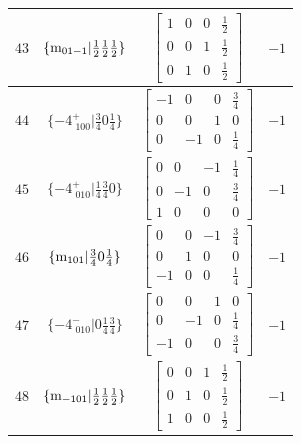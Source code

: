 \documentclass[fleqn,8pt]{jsarticle}
\begin{document}
\begin{longtable}{cccc}
$ 43 $ & $ \{{\rm m}_{01-1}|\frac{1}{2} \frac{1}{2} \frac{1}{2}\} $ & $ \begin{bmatrix} 1 & 0 & 0 & \frac{1}{2} \\ 0 & 0 & 1 & \frac{1}{2} \\ 0 & 1 & 0 & \frac{1}{2} \end{bmatrix} $ & $ -1 $ \\ \hline
$ 44 $ & $ \{-4^{+}_{\,\,100}|\frac{3}{4} 0 \frac{1}{4}\} $ & $ \begin{bmatrix} -1 & 0 & 0 & \frac{3}{4} \\ 0 & 0 & 1 & 0 \\ 0 & -1 & 0 & \frac{1}{4} \end{bmatrix} $ & $ -1 $ \\ \hline
$ 45 $ & $ \{-4^{+}_{\,\,010}|\frac{1}{4} \frac{3}{4} 0\} $ & $ \begin{bmatrix} 0 & 0 & -1 & \frac{1}{4} \\ 0 & -1 & 0 & \frac{3}{4} \\ 1 & 0 & 0 & 0 \end{bmatrix} $ & $ -1 $ \\ \hline
$ 46 $ & $ \{{\rm m}_{101}|\frac{3}{4} 0 \frac{1}{4}\} $ & $ \begin{bmatrix} 0 & 0 & -1 & \frac{3}{4} \\ 0 & 1 & 0 & 0 \\ -1 & 0 & 0 & \frac{1}{4} \end{bmatrix} $ & $ -1 $ \\ \hline
$ 47 $ & $ \{-4^{-}_{\,\,010}|0 \frac{1}{4} \frac{3}{4}\} $ & $ \begin{bmatrix} 0 & 0 & 1 & 0 \\ 0 & -1 & 0 & \frac{1}{4} \\ -1 & 0 & 0 & \frac{3}{4} \end{bmatrix} $ & $ -1 $ \\ \hline
$ 48 $ & $ \{{\rm m}_{-101}|\frac{1}{2} \frac{1}{2} \frac{1}{2}\} $ & $ \begin{bmatrix} 0 & 0 & 1 & \frac{1}{2} \\ 0 & 1 & 0 & \frac{1}{2} \\ 1 & 0 & 0 & \frac{1}{2} \end{bmatrix} $ & $ -1 $ \\
\end{longtable}
\end{document}
